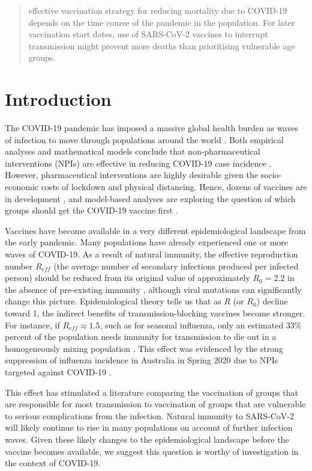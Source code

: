 \begin{abstract}
effective vaccination strategy for reducing mortality due to COVID-19 depends on the time course of the pandemic in the population. For later vaccination start dates, use of SARS-CoV-2 vaccines to interrupt transmission might prevent more deaths than prioritising vulnerable age groups.

\end{abstract}


\section{Introduction}


The COVID-19 pandemic has imposed a massive global health burden as waves of infection to move through populations around the world \cite{miller2020disease}.  Both empirical analyses and mathematical models conclude that non-pharmaceutical interventions (NPIs) are effective in reducing COVID-19 case incidence \cite{anderson2020estimating,peak2020individual,tuite2020mathematical}.  However, pharmaceutical interventions are highly desirable given the socio-economic costs of lockdown and physical distancing.  Hence, dozens of vaccines are  in development \cite{lurie2020developing}, and  model-based analyses are exploring the question of which groups should get the COVID-19 vaccine first \cite{bubar2020model,hoyt2020vaccine}.  


 Vaccines have become available in a very different epidemiological landscape from the early pandemic. Many populations have already experienced one or more waves of COVID-19.  As a result of natural immunity, the effective reproduction number $R_{eff}$ (the average number of secondary infections produced per infected person) should be reduced from its original value of approximately $R_0 = 2.2$ in the absence of pre-existing immunity \cite{hilton2020estimation}, although viral mutations can significantly change this picture. Epidemiological theory tells us that as $R$ (or $R_0$) decline toward 1, the indirect benefits of transmission-blocking vaccines become stronger.  For instance, if $R_{eff} \approx 1.5$, such as for seasonal influenza, only an estimated $33 \%$ percent of the population needs immunity for transmission to die out in a homogeneously mixing population  \cite{anderson1992infectious,dushoff2007vaccinating}.  This effect was evidenced by the strong suppression of influenza incidence in Australia in Spring 2020 due to NPIs targeted against COVID-19 \cite{aussie2020}. 

This effect has stimulated a literature comparing the vaccination of groups that are responsible for most transmission to vaccination of groups that are vulnerable to serious complications from the infection. Natural immunity to SARS-CoV-2 will likely continue to rise in many populations on account of further infection waves. Given these likely changes to the epidemiological landscape before the vaccine becomes available, we suggest this question is worthy of investigation in the context of COVID-19. 


